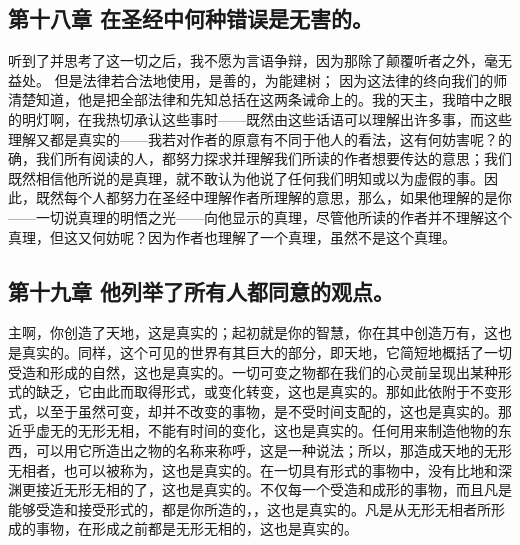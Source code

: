 
\subsection{第十八章 在圣经中何种错误是无害的。}

听到了并思考了这一切之后，我不愿为言语争辩，因为那除了颠覆听者之外，毫无益处。 但是法律若合法地使用，是善的，为能建树； 因为这法律的终向我们的师清楚知道，他是把全部法律和先知总括在这两条诫命上的。我的天主，我暗中之眼的明灯啊，在我热切承认这些事时——既然由这些话语可以理解出许多事，而这些理解又都是真实的——我若对作者的原意有不同于他人的看法，这有何妨害呢？的确，我们所有阅读的人，都努力探求并理解我们所读的作者想要传达的意思；我们既然相信他所说的是真理，就不敢认为他说了任何我们明知或以为虚假的事。因此，既然每个人都努力在圣经中理解作者所理解的意思，那么，如果他理解的是你——一切说真理的明悟之光——向他显示的真理，尽管他所读的作者并不理解这个真理，但这又何妨呢？因为作者也理解了一个真理，虽然不是这个真理。\par


\subsection{第十九章 他列举了所有人都同意的观点。}

主啊，你创造了天地，这是真实的；起初就是你的智慧，你在其中创造万有，这也是真实的。同样，这个可见的世界有其巨大的部分，即天地，它简短地概括了一切受造和形成的自然，这也是真实的。一切可变之物都在我们的心灵前呈现出某种形式的缺乏，它由此而取得形式，或变化转变，这也是真实的。那如此依附于不变形式，以至于虽然可变，却并不改变的事物，是不受时间支配的，这也是真实的。那近乎虚无的无形无相，不能有时间的变化，这也是真实的。任何用来制造他物的东西，可以用它所造出之物的名称来称呼，这是一种说法；所以，那造成天地的无形无相者，也可以被称为，这也是真实的。在一切具有形式的事物中，没有比地和深渊更接近无形无相的了，这也是真实的。不仅每一个受造和成形的事物，而且凡是能够受造和接受形式的，都是你所造的，，这也是真实的。凡是从无形无相者所形成的事物，在形成之前都是无形无相的，这也是真实的。\par


